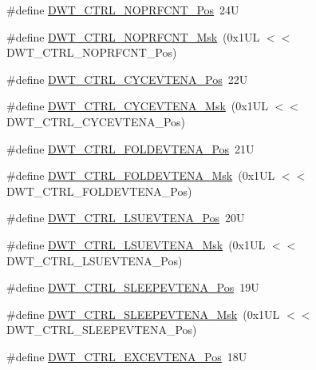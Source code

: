 \begin{DoxyCompactItemize}
\item 
\#define \hyperlink{group___c_m_s_i_s___d_w_t_gad52a0e5be84363ab166cc17beca0d048}{D\+W\+T\+\_\+\+C\+T\+R\+L\+\_\+\+N\+O\+P\+R\+F\+C\+N\+T\+\_\+\+Pos}~24U
\item 
\#define \hyperlink{group___c_m_s_i_s___d_w_t_gafd8448d7db4bc51f27f202e6e1f27823}{D\+W\+T\+\_\+\+C\+T\+R\+L\+\_\+\+N\+O\+P\+R\+F\+C\+N\+T\+\_\+\+Msk}~(0x1\+U\+L $<$$<$ D\+W\+T\+\_\+\+C\+T\+R\+L\+\_\+\+N\+O\+P\+R\+F\+C\+N\+T\+\_\+\+Pos)
\item 
\#define \hyperlink{group___c_m_s_i_s___d_w_t_ga0cb0640aaeb18a626d7823570d5c3cb6}{D\+W\+T\+\_\+\+C\+T\+R\+L\+\_\+\+C\+Y\+C\+E\+V\+T\+E\+N\+A\+\_\+\+Pos}~22U
\item 
\#define \hyperlink{group___c_m_s_i_s___d_w_t_ga40554bd81460e39abf08810f45fac1a2}{D\+W\+T\+\_\+\+C\+T\+R\+L\+\_\+\+C\+Y\+C\+E\+V\+T\+E\+N\+A\+\_\+\+Msk}~(0x1\+U\+L $<$$<$ D\+W\+T\+\_\+\+C\+T\+R\+L\+\_\+\+C\+Y\+C\+E\+V\+T\+E\+N\+A\+\_\+\+Pos)
\item 
\#define \hyperlink{group___c_m_s_i_s___d_w_t_ga5602b0707f446ce78d88ff2a3a82bfff}{D\+W\+T\+\_\+\+C\+T\+R\+L\+\_\+\+F\+O\+L\+D\+E\+V\+T\+E\+N\+A\+\_\+\+Pos}~21U
\item 
\#define \hyperlink{group___c_m_s_i_s___d_w_t_ga717e679d775562ae09185a3776b1582f}{D\+W\+T\+\_\+\+C\+T\+R\+L\+\_\+\+F\+O\+L\+D\+E\+V\+T\+E\+N\+A\+\_\+\+Msk}~(0x1\+U\+L $<$$<$ D\+W\+T\+\_\+\+C\+T\+R\+L\+\_\+\+F\+O\+L\+D\+E\+V\+T\+E\+N\+A\+\_\+\+Pos)
\item 
\#define \hyperlink{group___c_m_s_i_s___d_w_t_gaea5d1ee72188dc1d57b54c60a9f5233e}{D\+W\+T\+\_\+\+C\+T\+R\+L\+\_\+\+L\+S\+U\+E\+V\+T\+E\+N\+A\+\_\+\+Pos}~20U
\item 
\#define \hyperlink{group___c_m_s_i_s___d_w_t_gac47427f455fbc29d4b6f8a479169f2b2}{D\+W\+T\+\_\+\+C\+T\+R\+L\+\_\+\+L\+S\+U\+E\+V\+T\+E\+N\+A\+\_\+\+Msk}~(0x1\+U\+L $<$$<$ D\+W\+T\+\_\+\+C\+T\+R\+L\+\_\+\+L\+S\+U\+E\+V\+T\+E\+N\+A\+\_\+\+Pos)
\item 
\#define \hyperlink{group___c_m_s_i_s___d_w_t_ga9c6d62d121164013a8e3ee372f17f3e5}{D\+W\+T\+\_\+\+C\+T\+R\+L\+\_\+\+S\+L\+E\+E\+P\+E\+V\+T\+E\+N\+A\+\_\+\+Pos}~19U
\item 
\#define \hyperlink{group___c_m_s_i_s___d_w_t_ga2f431b3734fb840daf5b361034856da9}{D\+W\+T\+\_\+\+C\+T\+R\+L\+\_\+\+S\+L\+E\+E\+P\+E\+V\+T\+E\+N\+A\+\_\+\+Msk}~(0x1\+U\+L $<$$<$ D\+W\+T\+\_\+\+C\+T\+R\+L\+\_\+\+S\+L\+E\+E\+P\+E\+V\+T\+E\+N\+A\+\_\+\+Pos)
\item 
\#define \hyperlink{group___c_m_s_i_s___d_w_t_gaf4e73f548ae3e945ef8b1d9ff1281544}{D\+W\+T\+\_\+\+C\+T\+R\+L\+\_\+\+E\+X\+C\+E\+V\+T\+E\+N\+A\+\_\+\+Pos}~18U
$$
\end{DoxyCompactItemize}
